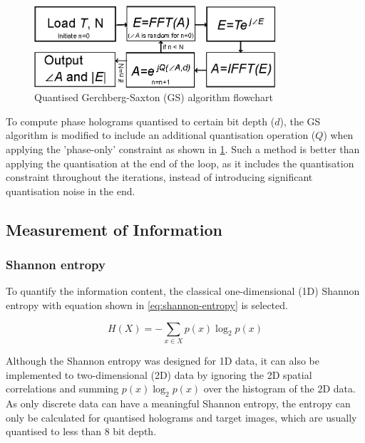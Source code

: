 	\begin{figure} [H]
	   \begin{center}
	   \includegraphics[width = 0.8\textwidth]{GS_quantized_flowchart.eps}
	   \end{center}
	   \caption{\label{fig:GS_quantised_flowchart} Quantised Gerchberg-Saxton (GS) algorithm flowchart}
	\end{figure}

	To compute phase holograms quantised to certain bit depth ($d$), the GS algorithm is modified to include an additional quantisation operation ($Q$) when applying the 'phase-only' constraint as shown in \cref{fig:GS_quantised_flowchart}. Such a method is better than applying the quantisation at the end of the loop, as it includes the quantisation constraint throughout the iterations, instead of introducing significant quantisation noise in the end.



\subsection{Measurement of Information}
\subsubsection{Shannon entropy}
	To quantify the information content, the classical one-dimensional (1D) Shannon entropy \cite{Shannon1948} with equation shown in \cref{eq:shannon-entropy} is selected.

	\begin{equation}
		H(X) = -\sum_{x\in X} p(x)\log_2p(x)
		\label{eq:shannon-entropy}
	\end{equation}

	Although the Shannon entropy was designed for 1D data, it can also be implemented to two-dimensional (2D) data by ignoring the 2D spatial correlations and summing $p(x)\log_2p(x)$ over the histogram of the 2D data. As only discrete data can have a meaningful Shannon entropy, the entropy can only be calculated for quantised holograms and target images, which are usually quantised to less than 8 bit depth.



